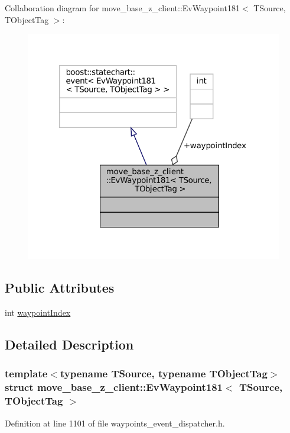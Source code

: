 Collaboration diagram for move\+\_\+base\+\_\+z\+\_\+client\+:\+:Ev\+Waypoint181$<$ T\+Source, T\+Object\+Tag $>$\+:
\nopagebreak
\begin{figure}[H]
\begin{center}
\leavevmode
\includegraphics[width=320pt]{structmove__base__z__client_1_1EvWaypoint181__coll__graph}
\end{center}
\end{figure}
\subsection*{Public Attributes}
\begin{DoxyCompactItemize}
\item 
int \hyperlink{structmove__base__z__client_1_1EvWaypoint181_aa5826b17e0995563f41f59bdbcc1f0ec}{waypoint\+Index}
\end{DoxyCompactItemize}


\subsection{Detailed Description}
\subsubsection*{template$<$typename T\+Source, typename T\+Object\+Tag$>$\newline
struct move\+\_\+base\+\_\+z\+\_\+client\+::\+Ev\+Waypoint181$<$ T\+Source, T\+Object\+Tag $>$}



Definition at line 1101 of file waypoints\+\_\+event\+\_\+dispatcher.\+h.



